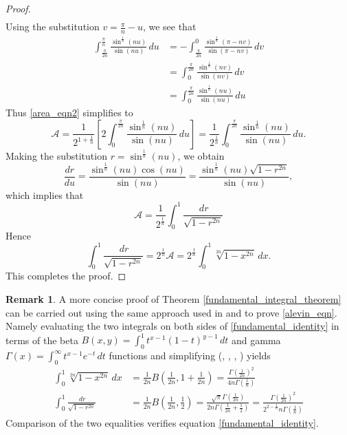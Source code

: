 \documentclass{amsart}
\theoremstyle{definition}
\newtheorem{remark}[theorem]{Remark}
\newcommand{\calA}{\mathcal{A}}
\begin{document}
\begin{proof}
\begin{align}
\end{align}
Using the substitution $v=\frac{\pi}{n}-u$, we see that
\begin{align*}
\int_{\frac{\pi}{2n}}^{\frac{\pi}{n}}\frac{\sin^{\frac{1}{n}}(nu)}{\sin(nu)}\,du &=-\int_{\frac{\pi}{2n}}^0\frac{\sin^{\frac{1}{n}}(\pi-nv)}{\sin(\pi-nv)}\,dv\\
&=\int_0^{\frac{\pi}{2n}}\frac{\sin^{\frac{1}{n}}(nv)}{\sin(nv)}\,dv\\
&=\int_0^{\frac{\pi}{2n}}\frac{\sin^{\frac{1}{n}}(nu)}{\sin(nu)}\,du
\end{align*}
Thus \eqref{area_eqn2} simplifies to
\begin{equation}
\calA=\frac{1}{2^{1+\frac{1}{n}}}\left[2\int_0^{\frac{\pi}{2n}}\frac{\sin^{\frac{1}{n}}(nu)}{\sin(nu)}\,du\right]=
\frac{1}{2^{\frac{1}{n}}}\int_0^{\frac{\pi}{2n}}\frac{\sin^{\frac{1}{n}}(nu)}{\sin(nu)}\,du.
\end{equation}
Making the substitution $r=\sin^{\frac{1}{n}}(nu)$, we obtain
\[\frac{dr}{du}=\frac{\sin^{\frac{1}{n}}(nu)\cos(nu)}{\sin(nu)}=\frac{\sin^{\frac{1}{n}}(nu)\sqrt{1-r^{2n}}}{\sin(nu)},\]
which implies that
\begin{equation}
\calA=\frac{1}{2^{\frac{1}{n}}}\int_0^1\frac{\,dr}{\sqrt{1-r^{2n}}}
\end{equation}
Hence
\[\int_0^1\frac{\,dr}{\sqrt{1-r^{2n}}}=2^{\frac{1}{n}}\calA=2^{\frac{1}{n}}\int_0^1 \sqrt[2n]{1-x^{2n}} \, dx.\]
This completes the proof.
\end{proof}

\bigskip

\begin{remark}
A more concise proof of Theorem \ref{fundamental_integral_theorem} can be carried out using the same approach
used in \cite{alevin} and \cite[p. 173]{squigonometry_book} to prove \eqref{alevin_eqn}. Namely evaluating the two
integrals on both sides of \eqref{fundamental_identity} in terms of the beta ${B(x,y)=\int_0^1 t^{x-1}(1-t)^{y-1}\,dt}$
and gamma ${\Gamma(x)=\int_0^\infty t^{x-1}e^{-t}\,dt}$ functions and simplifying (\cite{eartin}, \cite{whittaker-watson},
\cite{Wikipedia:beta_function}, \cite{Wikipedia:gamma_function}) yields
\begin{align*}
\int_0^1 \sqrt[2n]{1-x^{2n}} \, dx &= \frac{1}{2n}B\left(\frac{1}{2n},1+\frac{1}{2n}\right)
=\frac{\Gamma\left(\frac{1}{2n}\right)^2}{4n\Gamma\left(\frac{1}{n}\right)}\\
\int_0^1\frac{\,dr}{\sqrt{1-r^{2n}}} &=\frac{1}{2n}B\left(\frac{1}{2n},\frac{1}{2}\right)
=\frac{\sqrt{\pi}\Gamma\left(\frac{1}{2n}\right)}{2n\Gamma\left(\frac{1}{2n}+\frac{1}{2}\right)}
=\frac{\Gamma\left(\frac{1}{2n}\right)^2}{2^{2-\frac{1}{n}}n\Gamma\left(\frac{1}{n}\right)}
\end{align*}
Comparison of the two equalities verifies equation \eqref{fundamental_identity}.
\end{remark}
\end{document}
